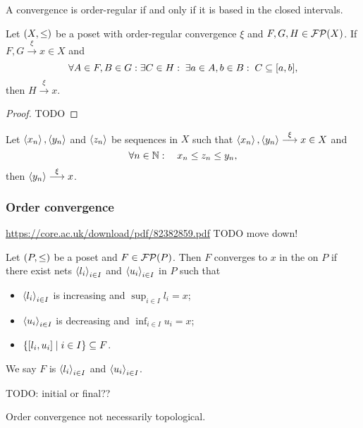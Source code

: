 \begin{lemma}
A convergence is order-regular \textup{if and only if} it is based in the closed intervals.
\end{lemma}

\begin{proposition}
Let $\left( X,\leq \right)$ be a poset with order-regular convergence $\xi$ and $F,G,H\in \operatorname{\mathcal{FP}}(X)$. If $F,G\overset{\xi}{\longrightarrow} x\in X$ and
\[ \forall A\in F,B\in G: \exists C\in H: \;\exists a\in A, b\in B:\; C\subseteq \interval{a,b},  \]
then $H\overset{\xi}{\longrightarrow} x$.
\end{proposition}
\begin{proof}
TODO
\end{proof}
\begin{corollary}
Let $\left\langle x_n \right\rangle, \left\langle y_n \right\rangle$ and $\left\langle z_n \right\rangle$ be sequences in $X$ such that $\left\langle x_n \right\rangle, \left\langle y_n \right\rangle\overset{\xi}{\longrightarrow} x\in X$ and
\[ \forall n\in \mathbb{N}: \quad x_n \leq z_n \leq y_n, \]
then $\left\langle y_n \right\rangle \overset{\xi}{\longrightarrow} x$.
\end{corollary}

\subsubsection{Order convergence}
\url{https://core.ac.uk/download/pdf/82382859.pdf}
TODO move down!

\begin{definition}
Let $\left( P,\leq \right)$ be a poset and $F\in\operatorname{\mathcal{FP}}(P)$. Then $F$ converges to $x$ in the  on $P$ if there exist nets $\left\langle l_i \right\rangle_{i\in I}$ and $\left\langle u_i \right\rangle_{i\in I}$ in $P$ such that
\begin{itemize}
    \item $\left\langle l_i \right\rangle_{i\in I}$ is increasing and $\sup_{i\in I} l_i = x$;
    \item $\left\langle u_i \right\rangle_{i\in I}$ is decreasing and $\inf_{i\in I} u_i = x$;
    \item $\left\{ [l_i, u_i] \;\middle|\; i\in I \right\} \subseteq F$.
\end{itemize}
We say $F$ is  $\left\langle l_i \right\rangle_{i\in I}$ and $\left\langle u_i \right\rangle_{i\in I}$.
\end{definition}

TODO: initial or final??

\begin{example}
Order convergence not necessarily topological.
\end{example}


